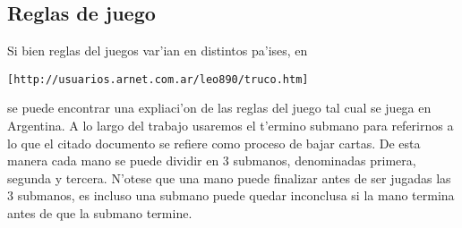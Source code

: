 \subsection{Reglas de juego}
Si bien reglas del juegos var'ian en distintos pa'ises, en 
\begin{verbatim}
[http://usuarios.arnet.com.ar/leo890/truco.htm]
\end{verbatim}
se puede encontrar una expliaci'on de las reglas del juego tal cual se juega en Argentina. A lo largo del trabajo usaremos el t'ermino submano para referirnos a lo que el citado documento se refiere como proceso de bajar cartas. De esta manera cada mano se puede dividir en 3 submanos, denominadas primera, segunda y tercera. N'otese que una mano puede finalizar antes de ser jugadas las 3 submanos, es incluso una submano puede quedar inconclusa si la mano termina antes de que la submano termine.